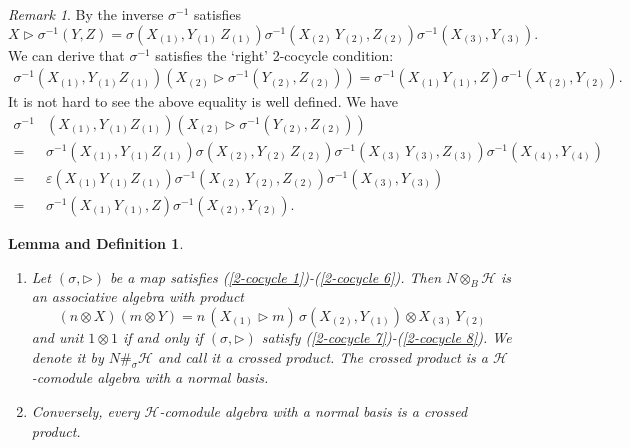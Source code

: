 \documentclass[a4paper,reqno]{amsart}
\numberwithin{equation}{section}
\theoremstyle{plain}
\newtheorem{LD}[thm]{Lemma and Definition}
\theoremstyle{remark}
\newtheorem{rem}[thm]{Remark}
\numberwithin{equation}{section}
\newcommand{\ot}{\otimes}
\renewcommand{\o}{{}_{\scriptscriptstyle{(1)}}}
\renewcommand{\t}{{}_{\scriptscriptstyle{(2)}}}
\renewcommand{\th}{{}_{\scriptscriptstyle{(3)}}}
\newcommand{\fo}{{}_{\scriptscriptstyle{(4)}}}
\newcommand{\la}{{\triangleright}}
\newcommand{\CH}{\mathcal{H}}
\begin{document}
\begin{rem}
By \cite[Lemma 4.10]{BB}   the inverse $\sigma^{-1}$ satisfies
\[X\la \sigma^{-1}(Y, Z)=\sigma(X\o, Y\o\,Z\o)\sigma^{-1}(X\t\,Y\t, Z\t)\sigma^{-1}(X\th, Y\th).\]
We can derive that $\sigma^{-1}$ satisfies the `right' 2-cocycle condition:
\begin{align}\label{equ. right cocycle}
  \sigma^{-1}(X\o, Y\o Z\o)(X\t\la \sigma^{-1}(Y\t, Z\t))=\sigma^{-1}(X\o Y\o, Z)\sigma^{-1}(X\t, Y\t).
\end{align}
It is not hard to see the above equality is well defined.
We have
\begin{align*}
    \sigma^{-1}&(X\o, Y\o Z\o)(X\t\la \sigma^{-1}(Y\t, Z\t))\\
    =&\sigma^{-1}(X\o, Y\o Z\o)\sigma(X\t, Y\t\,Z\t)\sigma^{-1}(X\th\,Y\th, Z\th)\sigma^{-1}(X\fo, Y\fo)\\
    =&\varepsilon(X\o Y\o Z\o)\sigma^{-1}(X\t\,Y\t, Z\t)\sigma^{-1}(X\th, Y\th)\\
    =&\sigma^{-1}(X\o Y\o, Z)\sigma^{-1}(X\t, Y\t).
\end{align*}
    
\end{rem}





\begin{LD}\cite{BB}\label{Lemma. crossed product}
    \begin{enumerate}
        \item 
    Let $(\sigma,\la)$ be a map satisfies (\ref{2-cocycle 1})-(\ref{2-cocycle 6}). Then $N\ot_{B}\CH$ is an associative algebra with product
    \[(n\ot X)(m\ot Y)=n\,(X\o\la m)\, \sigma(X\t, Y\o)\ot X\th\, Y\t\]
    and unit $1\ot 1$
    if and only if $(\sigma,\la)$ satisfy (\ref{2-cocycle 7})-(\ref{2-cocycle 8}).
    We denote it by  $N\#_{\sigma}\CH$ and call it a crossed product. The crossed product is a $\CH$-comodule algebra with a normal basis.
    \item Conversely, every $\CH$-comodule algebra with a normal basis is a crossed product. 
    \end{enumerate}
\end{LD}
\end{document}
